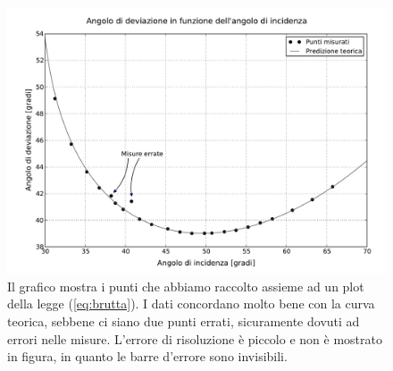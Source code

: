 \begin{figure}[b]
    \includegraphics[width=16cm]{graph.pdf}
    \caption{Il grafico mostra i punti che abbiamo raccolto assieme ad un plot della legge (\ref{eq:brutta}). I dati concordano
    molto bene con la curva teorica, sebbene ci siano due punti errati, sicuramente dovuti ad errori nelle misure. L'errore di
    risoluzione è piccolo e non è mostrato in figura, in quanto le barre d'errore sono invisibili.}
    \label{fig:dev}
\end{figure}
